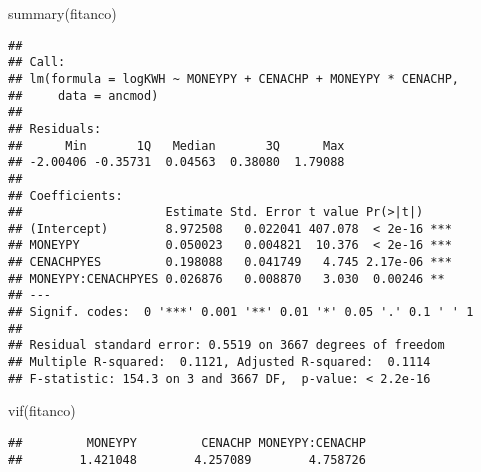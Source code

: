 \documentclass[
]{article}
\newenvironment{Shaded}{\begin{snugshade}}{\end{snugshade}}
\newcommand{\FunctionTok}[1]{\textcolor[rgb]{0.00,0.00,0.00}{#1}}
\newcommand{\NormalTok}[1]{#1}
\begin{document}
\begin{Shaded}
\begin{Highlighting}[]
\FunctionTok{summary}\NormalTok{(fitanco)}
\end{Highlighting}
\end{Shaded}

\begin{verbatim}
## 
## Call:
## lm(formula = logKWH ~ MONEYPY + CENACHP + MONEYPY * CENACHP, 
##     data = ancmod)
## 
## Residuals:
##      Min       1Q   Median       3Q      Max 
## -2.00406 -0.35731  0.04563  0.38080  1.79088 
## 
## Coefficients:
##                    Estimate Std. Error t value Pr(>|t|)    
## (Intercept)        8.972508   0.022041 407.078  < 2e-16 ***
## MONEYPY            0.050023   0.004821  10.376  < 2e-16 ***
## CENACHPYES         0.198088   0.041749   4.745 2.17e-06 ***
## MONEYPY:CENACHPYES 0.026876   0.008870   3.030  0.00246 ** 
## ---
## Signif. codes:  0 '***' 0.001 '**' 0.01 '*' 0.05 '.' 0.1 ' ' 1
## 
## Residual standard error: 0.5519 on 3667 degrees of freedom
## Multiple R-squared:  0.1121, Adjusted R-squared:  0.1114 
## F-statistic: 154.3 on 3 and 3667 DF,  p-value: < 2.2e-16
\end{verbatim}

\begin{Shaded}
\begin{Highlighting}[]
\FunctionTok{vif}\NormalTok{(fitanco)}
\end{Highlighting}
\end{Shaded}

\begin{verbatim}
##         MONEYPY         CENACHP MONEYPY:CENACHP 
##        1.421048        4.257089        4.758726
\end{verbatim}
\end{document}
